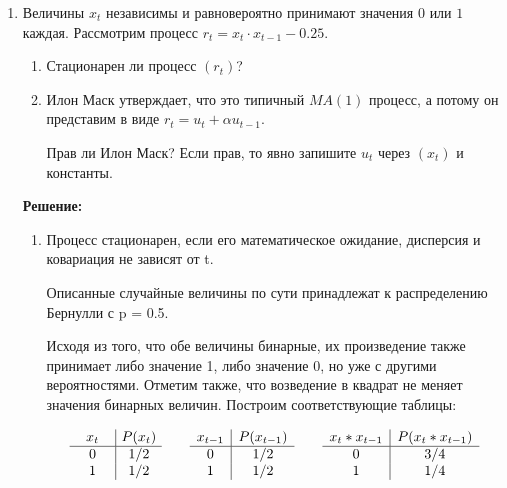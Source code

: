 \documentclass[a4paper,14pt]{article}
\begin{document}
\begin{enumerate}
\item Величины $x_t$ независимы и равновероятно принимают значения $0$ или $1$ каждая. 
Рассмотрим процесс $r_t = x_t \cdot x_{t-1} - 0.25$.
\begin{enumerate}
	\item Стационарен ли процесс $(r_t)$?
	\item Илон Маск утверждает, что это типичный $MA(1)$ процесс, а потому он представим в виде $r_t = u_t + \alpha u_{t-1}$.
	
	Прав ли Илон Маск? Если прав, то явно запишите $u_t$ через $(x_t)$ и константы. 
\end{enumerate}

{\bf Решение:}

\begin{enumerate}
	\item Процесс стационарен, если его математическое ожидание, дисперсия и ковариация не зависят от t.

 Описанные случайные величины по сути принадлежат к распределению Бернулли с p = 0.5. 

 Исходя из того, что обе величины бинарные, их произведение также принимает либо значение 1, либо значение 0, но уже с другими вероятностями. Отметим также, что возведение в квадрат не меняет значения бинарных величин. Построим соответствующие таблицы:

 \[
\begin{array}{w{c}{8mm}|w{c}{8mm}}
x_t & P(x_t) \\
\hline
0 & 1/2 \\
1 & 1/2 
\end{array}
\qquad
\begin{array}{c|c}
x_{t-1} & P(x_{t-1}) \\
\hline
0 & 1/2 \\
1 & 1/2 
\end{array}
\qquad
\begin{array}{c|c}
x_t*x_{t-1} & P(x_t*x_{t-1}) \\
\hline
0 & 3/4 \\
1 & 1/4 
\end{array}
\]


\end{enumerate}
\end{enumerate}
\end{document}
